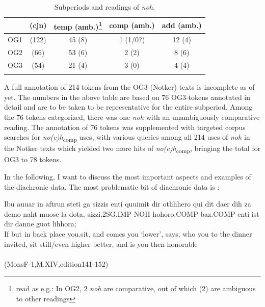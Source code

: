 \documentclass[output=paper
,modfonts
,nonflat]{langsci/langscibook}
\begin{document}
\begin{table}[p]
\begin{tabular}{lcccc}
\lsptoprule
	& (cjn) & temp (amb.)\footnote{read as e.g.: In OG2, 2 \textit{noh} are comparative, out of which (2) are ambiguous to other readings}& comp (amb.)	& add (amb.)	\\
\midrule
OG1		& (122) & 45 (8)    & 1 (1/0?)  & 12 (4)    \\ 
OG2		& (66)  & 53 (6)    & 2 (2)     & 8 (6)     \\
OG3		& (54)  & 21 (4)    & 3 (0)     & 4 (4)     \\
\lspbottomrule
\end{tabular}
\caption{Subperiods and readings of \textit{noh}.}
\label{tab:subperiods_and_readings}
\end{table}

\noindent A full annotation of 214 tokens from the OG3 (Notker) texts is incomplete as of yet. The numbers in the above table are based on 76 OG3-tokens annotated in detail and are to be taken to be representative for the entire subperiod. Among the 76 tokens categorized, there was one \textit{noh} with an unambiguously comparative reading. The annotation of 76 tokens was supplemented with targeted corpus searches for \textit{no(c)h}\textsubscript{comp} uses, with various queries among all 214 uses of \textit{noh} in the Notker texts which yielded two more hits of \textit{no(c)h}\textsubscript{comp}, bringing the total for OG3 to 78 tokens.

In the following, I want to discuss the most important aspects and examples of the diachronic data. The most problematic bit of diachronic data is :

\ea\gll Ibu auuar in aftrun steti {ga sizzis} enti quuimit dir otlihhero {qui dit} daer dih za demo {naht muose} {la dota,} sizzi.2SG.IMP NOH hohoro.COMP baz.COMP enti ist dir danne {guot lihhora;}\\
       If but in back place you.sit, and comes you `lower', says, who you to the dinner invited, sit still/even higher better, and is you then honorable\\
 \label{OG1_comp?_00} \\(MonsF-1,M.XIV,edition141-152)
\z
\end{document}
